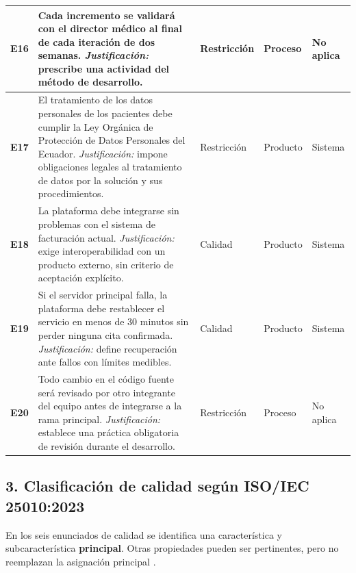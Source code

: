 \documentclass[12pt,a4paper]{article}
\begin{document}
\begin{longtable}{|p{0.72cm}|p{6.85cm}|p{2.00cm}|p{1.65cm}|p{1.75cm}|}
\textbf{E16} &
Cada incremento se validará con el director médico al final de cada iteración de dos semanas.
\emph{Justificación:} prescribe una actividad del método de desarrollo.
& Restricción & Proceso & No aplica\\ \hline

\textbf{E17} &
El tratamiento de los datos personales de los pacientes debe cumplir la Ley Orgánica de Protección de Datos Personales del Ecuador.
\emph{Justificación:} impone obligaciones legales al tratamiento de datos por la solución y sus procedimientos.
& Restricción & Producto & Sistema\\ \hline

\textbf{E18} &
La plataforma debe integrarse sin problemas con el sistema de facturación actual.
\emph{Justificación:} exige interoperabilidad con un producto externo, sin criterio de aceptación explícito.
& Calidad & Producto & Sistema\\ \hline

\textbf{E19} &
Si el servidor principal falla, la plataforma debe restablecer el servicio en menos de 30 minutos sin perder ninguna cita confirmada.
\emph{Justificación:} define recuperación ante fallos con límites medibles.
& Calidad & Producto & Sistema\\ \hline

\textbf{E20} &
Todo cambio en el código fuente será revisado por otro integrante del equipo antes de integrarse a la rama principal.
\emph{Justificación:} establece una práctica obligatoria de revisión durante el desarrollo.
& Restricción & Proceso & No aplica\\ \hline

\end{longtable}

\normalsize


\subsection*{3. Clasificación de calidad según ISO/IEC 25010:2023}

En los seis enunciados de calidad se identifica una característica y subcaracterística \textbf{principal}. Otras propiedades pueden ser pertinentes, pero no reemplazan la asignación principal \cite{iso25010}.
\end{document}
